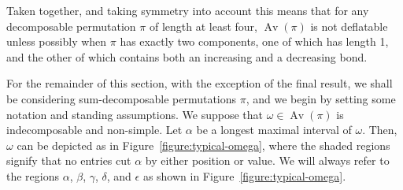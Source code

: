 \documentclass[10pt]{article}
\theoremstyle{plain}
\newcommand{\Av}{\operatorname{Av}}
\begin{document}
Taken together, and taking symmetry into account this means that for any decomposable permutation $\pi$ of length at least four, $\Av(\pi)$ is not deflatable unless possibly when $\pi$ has exactly two components, one of which has length 1, and the other of which contains both an increasing and a decreasing bond.

For the remainder of this section, with the exception of the final result, we shall be considering sum-decomposable permutations $\pi$, and we begin by setting some notation and standing assumptions. We suppose that $\omega \in \Av(\pi)$ is indecomposable and non-simple. Let $\alpha$ be a longest maximal interval of $\omega$. Then, $\omega$ can be depicted as in Figure~\ref{figure:typical-omega}, where the shaded regions signify that no entries cut $\alpha$ by either position or value. We will always refer to the regions $\alpha$, $\beta$, $\gamma$, $\delta$, and $\epsilon$ as shown in Figure~\ref{figure:typical-omega}.
\end{document}
